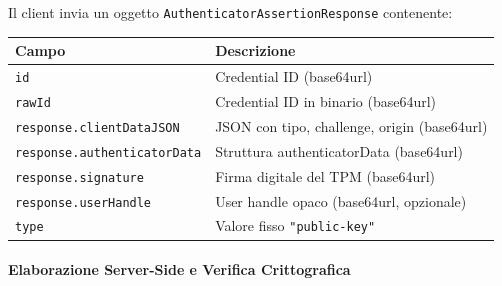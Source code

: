 Il client invia un oggetto \texttt{AuthenticatorAssertionResponse}
contenente:

\begin{center}
\begin{tabular}{@{}lp{9cm}@{}}
\toprule
\textbf{Campo} & \textbf{Descrizione} \\
\midrule
\texttt{id}               & Credential ID (base64url) \\
\texttt{rawId}            & Credential ID in binario (base64url) \\
\texttt{response.clientDataJSON}    & JSON con tipo, challenge, origin (base64url) \\
\texttt{response.authenticatorData} & Struttura authenticatorData (base64url) \\
\texttt{response.signature}         & Firma digitale del TPM (base64url) \\
\texttt{response.userHandle}        & User handle opaco (base64url, opzionale) \\
\texttt{type}             & Valore fisso \texttt{"public-key"} \\
\bottomrule
\end{tabular}
\end{center}

\paragraph{Elaborazione Server-Side e Verifica Crittografica}

